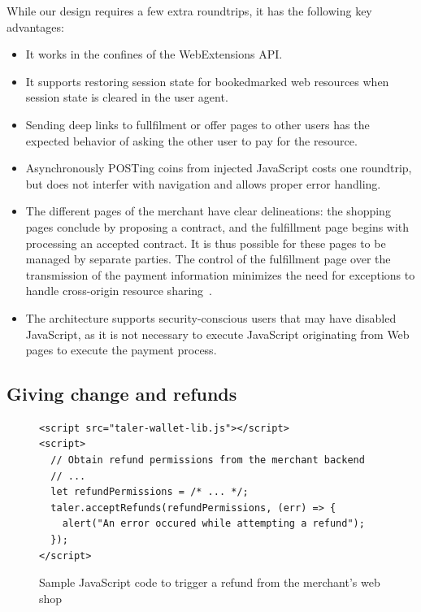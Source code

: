 \documentclass{llncs}
\begin{document}
\noindent
While our design requires a few extra roundtrips,
it has the following key advantages:
\begin{itemize}
  \item It works in the confines of the WebExtensions API.
  \item It supports restoring session state for bookedmarked
    web resources when session state is cleared in the user agent.
  \item Sending deep links to fullfilment or offer pages to
    other users has the expected behavior
    of asking the other user to pay for the resource.
  \item Asynchronously POSTing coins from injected JavaScript costs
    one roundtrip, but does not interfer with navigation and allows
    proper error handling.
  \item The different pages of the merchant have clear
    delineations: the shopping pages conclude by proposing a contract, and
    the fulfillment page begins with processing an accepted contract.  It is thus
    possible for these pages to be managed by separate parties. The
    control of the fulfillment page over the transmission of the payment
    information minimizes the need for exceptions to handle cross-origin
    resource sharing~\cite{rfc6454,cors}.
  \item The architecture supports security-conscious users that may have
    disabled JavaScript, as it is not necessary to execute JavaScript
    originating from Web pages to execute the payment process.
\end{itemize}


\subsection{Giving change and refunds}

\begin{figure}[b!]
\begin{lstlisting}
<script src="taler-wallet-lib.js"></script>
<script>
  // Obtain refund permissions from the merchant backend
  // ...
  let refundPermissions = /* ... */;
  taler.acceptRefunds(refundPermissions, (err) => {
    alert("An error occured while attempting a refund");
  });
</script>
\end{lstlisting}
 \caption{Sample JavaScript code to trigger a refund from the merchant's web shop}
  \label{listing:refund}
\end{figure}
\end{document}

